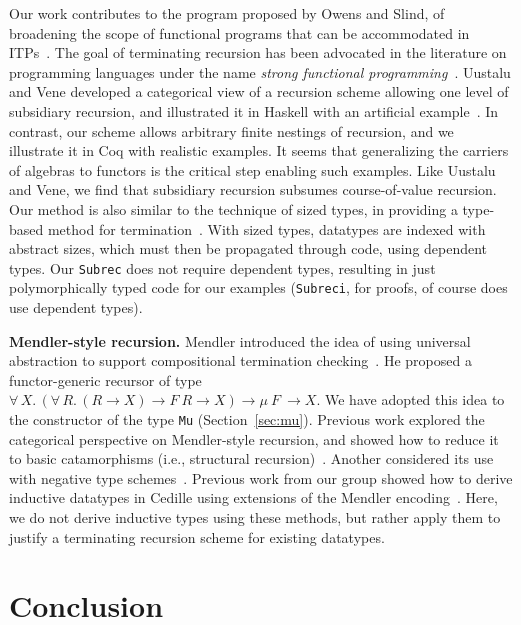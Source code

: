 \documentclass[a4paper,USenglish]{lipics-v2021}
\newcommand{\all}[2]{\forall\, #1.\, #2}
\begin{document}
Our work contributes to the program proposed by Owens and Slind, of
broadening the scope of functional programs that can be accommodated
in ITPs~\cite{owens+08}.  The goal of terminating recursion has been
advocated in the literature on programming languages under the name
\emph{strong functional programming}~\cite{turner95}.  Uustalu and
Vene developed a categorical view of a recursion scheme allowing one
level of subsidiary recursion, and illustrated it in Haskell with an
artificial example~\cite{uustalu11}.  In contrast, our scheme allows
arbitrary finite nestings of recursion, and we illustrate it in Coq
with realistic examples.  It seems that generalizing the carriers of
algebras to functors is the critical step enabling such examples.
Like Uustalu and Vene, we find that subsidiary recursion subsumes
course-of-value recursion.  Our method is also similar to the
technique of sized types, in providing a type-based method for
termination~\cite{barthe04}.  With sized types, datatypes are indexed
with abstract sizes, which must then be propagated through code, using
dependent types.  Our \verb|Subrec| does not require dependent types,
resulting in just polymorphically typed code for our examples
(\verb|Subreci|, for proofs, of course does use dependent types).

\textbf{Mendler-style recursion.}  Mendler introduced the idea of
using universal abstraction to support compositional termination
checking~\cite{mendler91}.  He proposed a functor-generic recursor of
type $\all{X}{(\all{R}{(R \to X) \to F\ R \to X}) \to \mu\ F\ \to
  X}$. We have adopted this idea to the constructor of the type
\verb|Mu| (Section~\ref{sec:mu}).  Previous work explored the
categorical perspective on Mendler-style recursion, and showed how to
reduce it to basic catamorphisms (i.e., structural
recursion)~\cite{uustalu99}.  Another considered its use with negative
type schemes~\cite{ahn11}.  Previous work from our group showed how to
derive inductive datatypes in Cedille using extensions of the Mendler
encoding~\cite{firsov+18b,firsov+18a}.  Here, we do not derive
inductive types using these methods, but rather apply them to justify
a terminating recursion scheme for existing datatypes.

\section{Conclusion}
\end{document}

